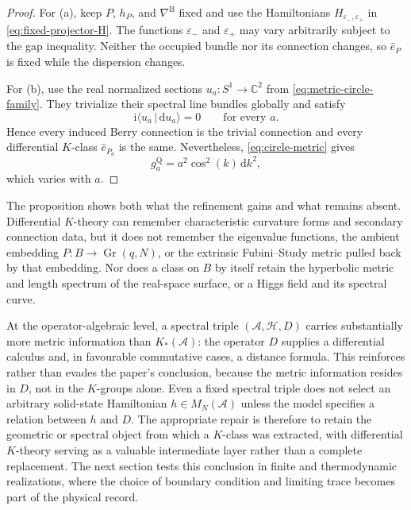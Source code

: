 \documentclass[11pt]{article}
\theoremstyle{definition}
\theoremstyle{remark}
\newcommand{\CC}{\mathbb C}
\newcommand{\cH}{\mathcal H}
\newcommand{\dd}{\mathrm d}
\newcommand{\ii}{\mathrm i}
\newcommand{\eps}{\varepsilon}
\newcommand{\braket}[2]{\langle #1\,|\,#2\rangle}
\begin{document}
\begin{proof}
For (a), keep \(P\), \(h_P\), and \(\nabla^{\mathrm B}\) fixed and use the
Hamiltonians \(H_{\eps_-,\eps_+}\) in
\eqref{eq:fixed-projector-H}.  The functions \(\eps_-\) and \(\eps_+\) may
vary arbitrarily subject to the gap inequality.  Neither the occupied bundle
nor its connection changes, so \(\widehat e_P\) is fixed while the dispersion
changes.

For (b), use the real normalized sections \(u_a:S^1\to\CC^2\) from
\eqref{eq:metric-circle-family}.  They trivialize their spectral line bundles
globally and satisfy
\[
               \ii\braket{u_a}{\dd u_a}=0
               \qquad\text{for every }a.
 \tag{9.12}\label{eq:real-family-berry}
\]
Hence every induced Berry connection is the trivial connection and every
differential \(K\)-class \(\widehat e_{P_a}\) is the same.  Nevertheless,
\eqref{eq:circle-metric} gives
\[
               g_a^{\mathrm Q}=a^2\cos^2(k)\,\dd k^2,
 \]
which varies with \(a\).
\end{proof}

The proposition shows both what the refinement gains and what remains absent.
Differential \(K\)-theory can remember characteristic curvature forms and
secondary connection data, but it does not remember the eigenvalue functions,
the ambient embedding \(P:B\to\operatorname{Gr}(q,N)\), or the extrinsic
Fubini--Study metric pulled back by that embedding.  Nor does a class on \(B\)
by itself retain the hyperbolic metric and length spectrum of the real-space
surface, or a Higgs field and its spectral curve.

At the operator-algebraic level, a spectral triple
\((\mathcal A,\cH,D)\) carries substantially more metric information than
\(K_*(\mathcal A)\): the operator \(D\) supplies a differential calculus and,
in favourable commutative cases, a distance formula.  This reinforces rather
than evades the paper's conclusion, because the metric information resides in
\(D\), not in the \(K\)-groups alone.  Even a fixed spectral triple does not
select an arbitrary solid-state Hamiltonian \(h\in M_N(\mathcal A)\) unless
the model specifies a relation between \(h\) and \(D\).  The appropriate
repair is therefore to retain the geometric or spectral object from which a
\(K\)-class was extracted, with differential \(K\)-theory serving as a
valuable intermediate layer rather than a complete replacement.  The next
section tests this conclusion in finite and thermodynamic realizations, where
the choice of boundary condition and limiting trace becomes part of the
physical record.
\end{document}

